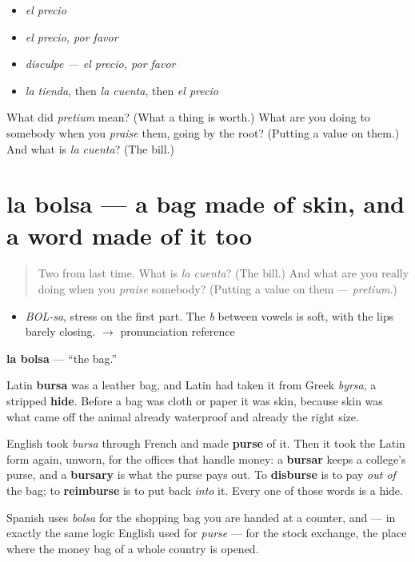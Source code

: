 \begin{itemize}
\raggedright
  \item \emph{el precio}
  \item \emph{el precio, por favor}
  \item \emph{disculpe — el precio, por favor}
  \item \emph{la tienda}, then \emph{la cuenta}, then \emph{el precio}
\end{itemize}

\begin{tcolorbox}[breakable,colback=teal!4,colframe=teal!35!black,title={Before you move on}]
What did \emph{pretium} mean? (What a thing is worth.) What are you doing to somebody when you \emph{praise} them, going by the root? (Putting a value on them.) And what is \emph{la cuenta}? (The bill.)
\end{tcolorbox}
\section[la bolsa]{la bolsa — a bag made of skin, and a word made of it too}

\label{lesson:ES-C311-bolsa}



\begin{quote}
Two from last time. What is \emph{la cuenta}? (The bill.) And what are you really doing when you \emph{praise} somebody? (Putting a value on them — \emph{pretium}.)
\end{quote}

\begin{sounds}
\begin{itemize}
\raggedright
  \item \emph{BOL-sa}, stress on the first part. The \emph{b} between vowels is soft, with the lips barely closing. $\to$ pronunciation reference
\end{itemize}
\end{sounds}

\begin{cousinweb}
\textbf{la bolsa} — \textquotedblleft{}the bag.\textquotedblright{}

Latin \textbf{bursa} was a leather bag, and Latin had taken it from Greek \emph{byrsa}, a stripped \textbf{hide}. Before a bag was cloth or paper it was skin, because skin was what came off the animal already waterproof and already the right size.

English took \emph{bursa} through French and made \textbf{purse} of it. Then it took the Latin form again, unworn, for the offices that handle money: a \textbf{bursar} keeps a college's purse, and a \textbf{bursary} is what the purse pays out. To \textbf{disburse} is to pay \emph{out of} the bag; to \textbf{reimburse} is to put back \emph{into} it. Every one of those words is a hide.

Spanish uses \emph{bolsa} for the shopping bag you are handed at a counter, and — in exactly the same logic English used for \emph{purse} — for the stock exchange, the place where the money bag of a whole country is opened.
\end{cousinweb}

